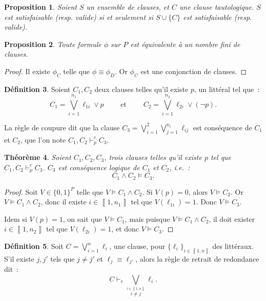 \documentclass{article}
\newtheorem{thm}{Théorème}[section]
\newtheorem{prp}[thm]{Proposition}
\theoremstyle{definition}
\newtheorem{déf}[thm]{Définition}
\theoremstyle{remark}
\newcommand{\intint}[2]{\left\llbracket#1, #2\right\rrbracket}
\begin{document}
	\begin{prp} Soient $S$ un ensemble de clauses, et $C$ une clause tautologique. $S$ est satisfaisable (resp. valide) si et seulement si $S \cup \{C\}$
	est satisfaisable (resp. valide).
	\end{prp}

	\begin{prp} Toute formule $\phi$ sur $P$ est équivalente à un nombre fini de clauses.
	\end{prp}

	\begin{proof} Il existe $\phi_C$ telle que $\phi \equiv \phi_D$. Or $\phi_C$ est une conjonction de clauses.
	\end{proof}

	\begin{déf} Soient $C_1, C_2$ deux clauses telles qu'il existe $p$, un littéral tel que~:
	\[C_1 = \bigvee_{i=1}^{n_1}\ell_{1i} \lor p \qquad \text{ et } \qquad C_2 = \bigvee_{i=1}^{n_2} \ell_{2i} \lor (\lnot p).\]

	La règle de coupure dit que la clause $C_3 = \bigvee_{i=1}^2\bigvee_{j=1}^{n_i}\ell_{ij}$ est conséquence de $C_1$ et $C_2$, que l'on note $C_1,C_2 \vdash_p^c C_3$.
	\end{déf}

	\begin{thm} Soient $C_1, C_2, C_3$, trois clauses telles qu'il existe $p$ tel que $C_1,C_2 \vdash_p^c C_3$. $C_3$ est conséquence logique de $C_1$ et $C_2$, i.e.~:
	\[C_1 \land C_2 \models C_3.\]
	\end{thm}

	\begin{proof} Soit $V \in \{0, 1\}^P$ telle que $V \models C_1 \land C_2$. Si $V(p) = 0$, alors $V \models C_2$. Or $V \models C_1 \land C_2$, donc il existe
	$i \in \intint 1{n_1}$ tel que $V(\ell_{1i}) = 1$. Donc $V \models C_3$.

	Idem si $V(p) = 1$, on sait que $V \models C_1$, mais puisque $V \models C_1 \land C_2$, il doit exister $i \in \intint 1{n_2}$ tel que $V(\ell_{2i}) = 1$,
	et donc $V \models C_3$.
	\end{proof}

	\begin{déf} Soit $C = \bigvee_{i=1}^n\ell_i$, une clause, pour $\{\ell_i\}_{i \in \intint 1n}$ des littéraux. S'il existe $j, j'$ tels que
	$j \neq j'$ et $\ell_j \equiv \ell_{j'}$, alors la règle de retrait de redondance dit~:
	\[C \vdash_r \bigvee_{\stackrel {i \in \intint 1n}{i \neq j}}\ell_i.\]
	\end{déf}
\end{document}
